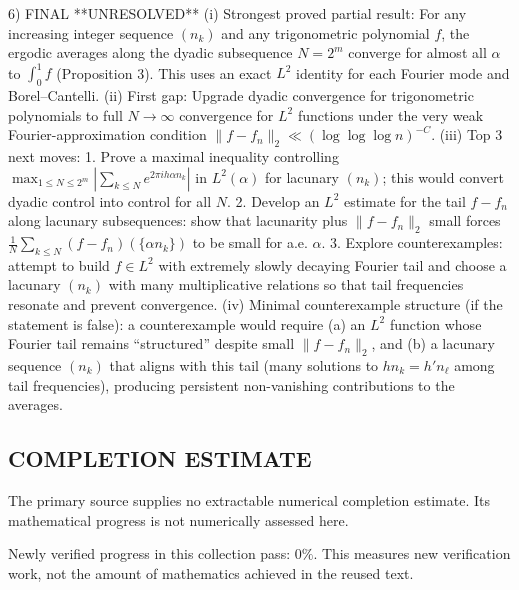 6) FINAL
**UNRESOLVED**
(i) Strongest proved partial result: For any increasing integer sequence $(n_k)$ and any trigonometric polynomial $f$, the ergodic averages along the dyadic subsequence $N=2^m$ converge for almost all $\alpha$ to $\int_0^1 f$ (Proposition 3).  This uses an exact $L^2$ identity for each Fourier mode and Borel--Cantelli.
(ii) First gap: Upgrade dyadic convergence for trigonometric polynomials to full $N\to\infty$ convergence for $L^2$ functions under the very weak Fourier-approximation condition $\|f-f_n\|_2\ll (\log\log\log n)^{-C}$.
(iii) Top 3 next moves:
  1. Prove a maximal inequality controlling $\max_{1\le N\le 2^m}\left|\sum_{k\le N} e^{2\pi i h\alpha n_k}\right|$ in $L^2(\alpha)$ for lacunary $(n_k)$; this would convert dyadic control into control for all $N$.
  2. Develop an $L^2$ estimate for the tail $f-f_n$ along lacunary subsequences: show that lacunarity plus $\|f-f_n\|_2$ small forces $\frac1N\sum_{k\le N}(f-f_n)(\{\alpha n_k\})$ to be small for a.e. $\alpha$.
  3. Explore counterexamples: attempt to build $f\in L^2$ with extremely slowly decaying Fourier tail and choose a lacunary $(n_k)$ with many multiplicative relations so that tail frequencies resonate and prevent convergence.
(iv) Minimal counterexample structure (if the statement is false): a counterexample would require (a) an $L^2$ function whose Fourier tail remains ``structured'' despite small $\|f-f_n\|_2$, and (b) a lacunary sequence $(n_k)$ that aligns with this tail (many solutions to $h n_k = h' n_\ell$ among tail frequencies), producing persistent non-vanishing contributions to the averages.




\subsection*{COMPLETION ESTIMATE}
The primary source supplies no extractable numerical completion estimate. Its mathematical progress is not numerically assessed here.

Newly verified progress in this collection pass: $0\%$. This measures new verification work, not the amount of mathematics achieved in the reused text.
